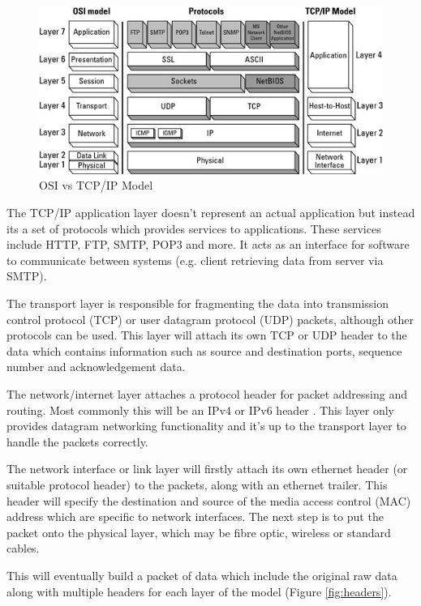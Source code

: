 \documentclass[final_report.tex]{subfiles}
\begin{document}
\begin{figure}[H]
	\centering
	\includegraphics[width=\textwidth]{img/layers.jpg}
	\caption{OSI vs TCP/IP Model}
	\label{fig:layers}
\end{figure}

The TCP/IP application layer doesn't represent an actual application but instead its a set of protocols which provides services to applications. These services include HTTP, FTP, SMTP, POP3 and more. It acts as an interface for software to communicate between systems (e.g. client retrieving data from server via SMTP).

The transport layer is responsible for fragmenting the data into transmission control protocol (TCP) or user datagram protocol (UDP) packets, although other protocols can be used. This layer will attach its own TCP or UDP header to the data which contains information such as source and destination ports, sequence number and acknowledgement data.

The network/internet layer attaches a protocol header for packet addressing and routing. Most commonly this will be an IPv4 or IPv6 header . This layer only provides datagram networking functionality and it's up to the transport layer to handle the packets correctly.

The network interface or link layer will firstly attach its own ethernet header (or suitable protocol header) to the packets, along with an ethernet trailer. This header will specify the destination and source of the media access control (MAC) address which are specific to network interfaces. The next step is to put the packet onto the physical layer, which may be fibre optic, wireless or standard cables.

This will eventually build a packet of data which include the original raw data along with multiple headers for each layer of the model (Figure \ref{fig:headers}).
\end{document}
